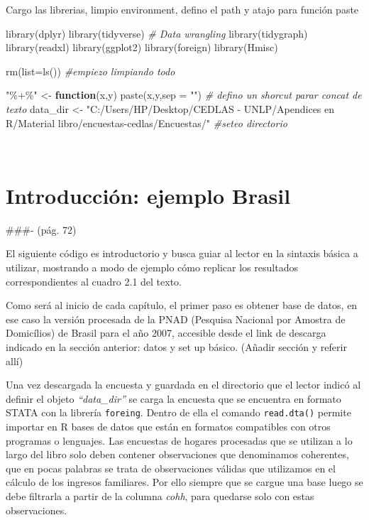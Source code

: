 \documentclass[
]{book}
\newenvironment{Shaded}{\begin{snugshade}}{\end{snugshade}}
\newcommand{\AttributeTok}[1]{\textcolor[rgb]{0.77,0.63,0.00}{#1}}
\newcommand{\CommentTok}[1]{\textcolor[rgb]{0.56,0.35,0.01}{\textit{#1}}}
\newcommand{\ControlFlowTok}[1]{\textcolor[rgb]{0.13,0.29,0.53}{\textbf{#1}}}
\newcommand{\FunctionTok}[1]{\textcolor[rgb]{0.00,0.00,0.00}{#1}}
\newcommand{\NormalTok}[1]{#1}
\newcommand{\OtherTok}[1]{\textcolor[rgb]{0.56,0.35,0.01}{#1}}
\newcommand{\StringTok}[1]{\textcolor[rgb]{0.31,0.60,0.02}{#1}}
\begin{document}
Cargo las librerias, limpio environment, defino el path y atajo para función paste

\begin{Shaded}
\begin{Highlighting}[]
\FunctionTok{library}\NormalTok{(dplyr)}
\FunctionTok{library}\NormalTok{(tidyverse) }\CommentTok{\# Data wrangling}
\FunctionTok{library}\NormalTok{(tidygraph)}
\FunctionTok{library}\NormalTok{(readxl)}
\FunctionTok{library}\NormalTok{(ggplot2)}
\FunctionTok{library}\NormalTok{(foreign)}
\FunctionTok{library}\NormalTok{(Hmisc)}

\FunctionTok{rm}\NormalTok{(}\AttributeTok{list=}\FunctionTok{ls}\NormalTok{())    }\CommentTok{\#empiezo limpiando todo }

\StringTok{"\%+\%"} \OtherTok{\textless{}{-}} \ControlFlowTok{function}\NormalTok{(x,y) }\FunctionTok{paste}\NormalTok{(x,y,}\AttributeTok{sep =} \StringTok{""}\NormalTok{)      }\CommentTok{\# defino un shorcut parar concat de texto}
\NormalTok{data\_dir }\OtherTok{\textless{}{-}} \StringTok{"C:/Users/HP/Desktop/CEDLAS {-} UNLP/Apendices en R/Material libro/encuestas{-}cedlas/Encuestas/"}  \CommentTok{\#seteo directorio }
\end{Highlighting}
\end{Shaded}

~

\hypertarget{introducciuxf3n-ejemplo-brasil}{%
\section{Introducción: ejemplo Brasil}\label{introducciuxf3n-ejemplo-brasil}}

\#\#\#- (pág. 72)

El siguiente código es introductorio y busca guiar al lector en la sintaxis básica a utilizar, mostrando a modo de ejemplo cómo replicar los resultados correspondientes al cuadro 2.1 del texto.

Como será al inicio de cada capítulo, el primer paso es obtener base de datos, en ese caso la versión procesada de la PNAD (Pesquisa Nacional por Amostra de Domicílios) de Brasil para el año 2007, accesible desde el link de descarga indicado en la sección anterior: datos y set up básico. (Añadir sección y referir allí)

Una vez descargada la encuesta y guardada en el directorio que el lector indicó al definir el objeto \emph{``data\_dir''} se carga la encuesta que se encuentra en formato STATA con la librería \texttt{foreing}. Dentro de ella el comando \texttt{read.dta()} permite importar en R bases de datos que están en formatos compatibles con otros programas o lenguajes. Las encuestas de hogares procesadas que se utilizan a lo largo del libro solo deben contener observaciones que denominamos coherentes, que en pocas palabras se trata de observaciones válidas que utilizamos en el cálculo de los ingresos familiares. Por ello siempre que se cargue una base luego se debe filtrarla a partir de la columna \emph{cohh}, para quedarse solo con estas observaciones.
\end{document}
